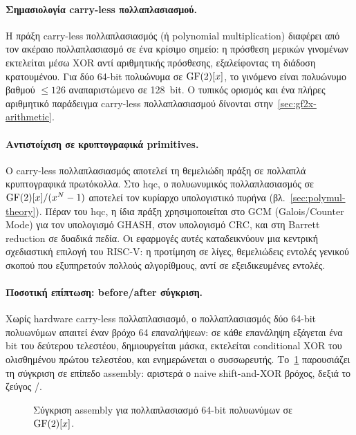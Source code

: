 \paragraph{Σημασιολογία carry-less πολλαπλασιασμού.}
Η πράξη carry-less πολλαπλασιασμός (ή polynomial multiplication)
διαφέρει από τον ακέραιο πολλαπλασιασμό σε ένα κρίσιμο σημείο: η πρόσθεση
μερικών γινομένων εκτελείται μέσω XOR αντί αριθμητικής πρόσθεσης, εξαλείφοντας
τη διάδοση κρατουμένου. Για δύο 64-bit πολυώνυμα σε $\mathrm{GF}(2)[x]$, το γινόμενο
είναι πολυώνυμο βαθμού $\leq 126$ αναπαριστώμενο σε 128~bit. Ο τυπικός
ορισμός και ένα πλήρες αριθμητικό παράδειγμα carry-less πολλαπλασιασμού
δίνονται στην~\cref{sec:gf2x-arithmetic}.

\paragraph{Αντιστοίχιση σε κρυπτογραφικά primitives.}
Ο carry-less πολλαπλασιασμός αποτελεί τη θεμελιώδη πράξη σε πολλαπλά
κρυπτογραφικά πρωτόκολλα. Στο \gls{hqc}, ο πολυωνυμικός πολλαπλασιασμός σε
$\mathrm{GF}(2)[x]/(x^N - 1)$ αποτελεί τον κυρίαρχο υπολογιστικό πυρήνα
(βλ.~\cref{sec:polymul-theory}). Πέραν του \gls{hqc}, η ίδια πράξη χρησιμοποιείται
στο GCM (Galois/Counter Mode) για τον υπολογισμό GHASH, στον υπολογισμό CRC, 
και στη Barrett reduction σε δυαδικά
πεδία. Οι εφαρμογές αυτές καταδεικνύουν μια κεντρική σχεδιαστική επιλογή
του RISC-V: η προτίμηση σε λίγες, θεμελιώδεις εντολές γενικού σκοπού που
εξυπηρετούν πολλούς αλγορίθμους, αντί σε εξειδικευμένες εντολές.

\paragraph{Ποσοτική επίπτωση: before/after σύγκριση.}
Χωρίς hardware carry-less πολλαπλασιασμό, ο πολλαπλασιασμός δύο 64-bit πολυωνύμων
απαιτεί έναν βρόχο \num{64} επαναλήψεων: σε κάθε επανάληψη εξάγεται ένα bit
του δεύτερου τελεστέου, δημιουργείται μάσκα, εκτελείται conditional XOR του
ολισθημένου πρώτου τελεστέου, και ενημερώνεται ο συσσωρευτής.
Το~\cref{fig:clmul-before-after} παρουσιάζει τη σύγκριση σε επίπεδο assembly:
αριστερά ο naive shift-and-XOR βρόχος, δεξιά το ζεύγος \clmul/\clmulh.

\begin{figure}[htbp]
  \centering
  
  \caption{Σύγκριση assembly για πολλαπλασιασμό 64-bit πολυωνύμων σε
    $\mathrm{GF}(2)[x]$.}
  \label{fig:clmul-before-after}
\end{figure}


